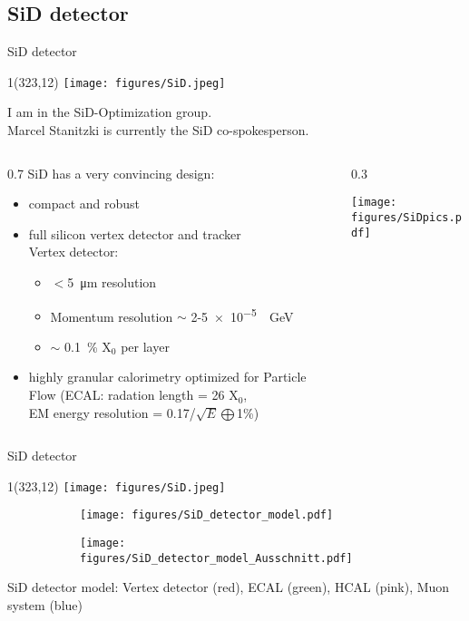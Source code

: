 \documentclass[xcolor={dvipsnames}]{beamer}
\newcommand{\sidlogo}{
  \setlength{\TPHorizModule}{1pt}
  \setlength{\TPVertModule}{1pt}
  \begin{textblock}{1}(323,12)
   \texttt{[image: figures/SiD.jpeg]}
  \end{textblock}
  }
\begin{document}
\subsection{SiD detector}
\begin{frame}{SiD detector}
\sidlogo
 I am in the SiD-Optimization group.\\
 Marcel Stanitzki is currently the SiD co-spokesperson.\\
 \vspace*{0.3cm}
 \begin{columns}
  \begin{column}{0.7\textwidth}
    SiD has a very convincing design:
 \begin{itemize}
  \item compact and robust
  \item full silicon vertex detector and tracker
  \\Vertex detector:
  \begin{itemize}
   \item $<$\SI{5}{\micro\metre} resolution
   \item Momentum resolution $\sim$ 2-\SI{5e-5}{\per\giga\electronvolt}
   \item $\sim$ \SI{0.1}{\percent} X$_0$ per layer
  \end{itemize}

  \item highly granular calorimetry optimized for Particle Flow (ECAL: radation length = 26 X$_0$, \\EM energy resolution = 0.17/$\sqrt{E}\bigoplus$1\%)
 \end{itemize}
  \end{column}
  \begin{column}{0.3\textwidth}
    \begin{flushright}
  \texttt{[image: figures/SiDpics.pdf]}
 \end{flushright}
  \end{column}
 \end{columns}
\end{frame}

\begin{frame}{SiD detector}
\sidlogo
\begin{figure}[T]
\centering
\begin{subfigure}[b]{0.49\textwidth}
\centering
\texttt{[image: figures/SiD\_detector\_model.pdf]}
\end{subfigure}
\begin{subfigure}[b]{0.49\textwidth}
\centering
\texttt{[image: figures/SiD\_detector\_model\_Ausschnitt.pdf]}
\end{subfigure}
\end{figure}
{\small SiD detector model: Vertex detector (red), ECAL (green), HCAL (pink), Muon system (blue)}
\end{frame}
\end{document}
